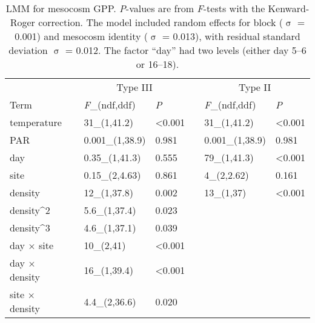 \documentclass[12pt]{article}
\begin{document}
\begin{table}
\caption{\label{tab:gpp}
LMM for mesocosm GPP. 
\emph{P}-values are from \emph{F}-tests with the Kenward-Roger correction.
The model included random effects for block ($\upsigma$ = 0.001)
and mesocosm identity ($\upsigma$ = 0.013), 
with residual standard deviation $\upsigma$ = 0.012.
The factor ``day'' had two levels (either day 5--6 or 16--18).}
\setlength{\tabcolsep}{12pt}
\begin{tabular}{lllllll}
\toprule
& & \multicolumn{2}{c}{Type III} & & \multicolumn{2}{c}{Type II} \\
\cmidrule{3-4} \cmidrule{6-7}
Term & & \emph{F}_{(ndf,ddf)} & \emph{P} & & \emph{F}_{(ndf,ddf)} & \emph{P}\\
\midrule
temperature & & 31_{(1,41.2)} & <0.001 & & 31_{(1,41.2)} & <0.001\\

PAR & & 0.001_{(1,38.9)} & 0.981 & & 0.001_{(1,38.9)} & 0.981\\

day & & 0.35_{(1,41.3)} & 0.555 & & 79_{(1,41.3)} & <0.001\\

site & & 0.15_{(2,4.63)} & 0.861 & & 4_{(2,2.62)} & 0.161\\

density & & 12_{(1,37.8)} & 0.002 & & 13_{(1,37)} & <0.001\\

density^2 & & 5.6_{(1,37.4)} & 0.023 & &  & \\

density^3  & & 4.6_{(1,37.1)} & 0.039 & & & \\

day $\times$ site & & 10_{(2,41)} & <0.001 & & & \\

day $\times$ density & & 16_{(1,39.4)} & <0.001 & & & \\

site $\times$ density & & 4.4_{(2,36.6)} & 0.020 & & & \\
\bottomrule
\end{tabular}
\end{table}


\clearpage



\end{document}
